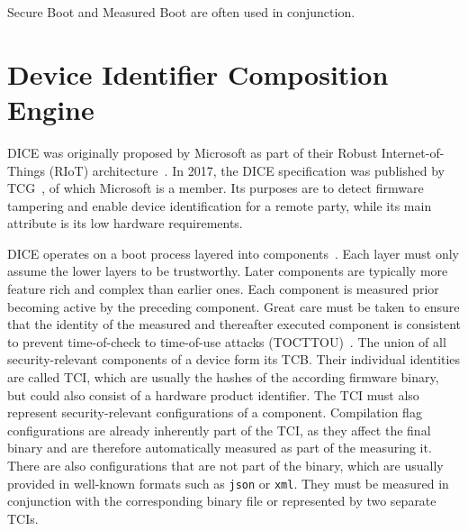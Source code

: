 Secure Boot and Measured Boot are often used in conjunction.

\section{Device Identifier Composition Engine}

\Ac{DICE} was originally proposed by Microsoft as part of their Robust Internet-of-Things (RIoT) architecture~\cite{England2016}.
In 2017, the DICE specification was published by \ac{TCG}~\cite{tcg-microsoft-tpm}, of which Microsoft is a member.
Its purposes are to detect firmware tampering and enable device identification for a remote party, while its main attribute is its low hardware requirements.


DICE operates on a boot process layered into components~\cite{dice-layering-arch}.
Each layer must only assume the lower layers to be trustworthy.
Later components are typically more feature rich and complex than earlier ones.
Each component is measured prior becoming active by the preceding component.
Great care must be taken to ensure that the identity of the measured and thereafter executed component is consistent to prevent time-of-check to time-of-use attacks (TOCTTOU)~\cite{Hristozov2022, Carpent2018}.
The union of all security-relevant components of a device form its \ac{TCB}.
Their individual identities are called \ac{TCI}, which are usually the hashes of the according firmware binary, but could also consist of a hardware product identifier.
The TCI must also represent security-relevant configurations of a component.
Compilation flag configurations are already inherently part of the TCI, as they affect the final binary and are therefore automatically measured as part of the measuring it.
There are also configurations that are not part of the binary, which are usually provided in well-known formats such as \texttt{json} or \texttt{xml}.
They must be measured in conjunction with the corresponding binary file or represented by two separate \acp{TCI}.


